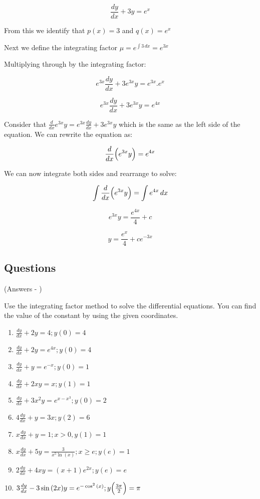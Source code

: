 \documentclass[../main.tex]{subfiles}
\begin{document}
\[\frac{dy}{dx}+3y=e^x\]

From this we identify that $p(x)=3$ and $q(x)=e^x$

Next we define the integrating factor $\mu=e^{\int 3\,dx}=e^{3x}$

Multiplying through by the integrating factor:

\[e^{3x}\frac{dy}{dx}+3e^{3x}y=e^{3x}.e^x\]

\[e^{3x}\frac{dy}{dx}+3e^{3x}y=e^{4x}\]

Consider that $\frac{d}{dx}e^{3x}y=e^{3x}\frac{dy}{dx}+3e^{3x}y$ which is the same as the left side of the equation. We can rewrite the equation as:

\[\frac{d}{dx}\Bigl(e^{3x}y\Bigr)=e^{4x}\]

We can now integrate both sides and rearrange to solve:

\[\int \frac{d}{dx}\Bigl(e^{3x}y\Bigr)=\int e^{4x}\,dx\]

\[e^{3x}y=\frac{e^{4x}}{4}+c\]

\[y=\frac{e^x}{4}+ce^{-3x}\]

\pagebreak

\subsection*{Questions}
(Answers - {\pageref{Integrating factor answers}})
\label{Integrating factor method}

Use the integrating factor method to solve the differential equations. You can find the value of the constant by using the given coordinates.
\begin{enumerate}[itemsep=0.7cm]
    \item 
    $\frac{dy}{dx}+2y=4; y(0)=4$

    \item 
    $\frac{dy}{dx}+2y=e^{4x}; y(0)=4$

    \item 
    $\frac{dy}{dx}+y=e^{-x}; y(0)=1$

    \item 
    $\frac{dy}{dx}+2xy=x; y(1)=1$

    \item 
    $\frac{dy}{dx}+3x^2 y=e^{x-x^3}; y(0)=2$

    \item 
    $4\frac{dy}{dx}+y=3x; y(2)=6$

    \item 
    $x\frac{dy}{dx}+y=1; x>0, y(1)=1$

    \item 
    $x\frac{dy}{dx}+5y=\frac{3}{x^5 \ln{(x)}}; x\geq e; y(e)=1$

    \item 
    $2\frac{dy}{dx}+4xy=(x+1)e^{2x}; y(e)=e$

    \item 
    $3\frac{dy}{dx}-3\sin{(2x)}y=e^{-\cos^2{(x)}}; y\Bigl(\frac{3\pi}{2}\Bigr)=\pi$



\end{enumerate}
\end{document}
